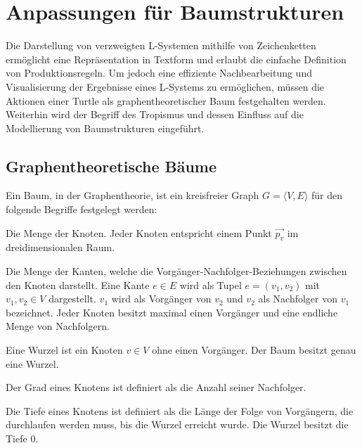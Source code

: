 \section{Anpassungen für Baumstrukturen}

Die Darstellung von verzweigten L-Systemen mithilfe von Zeichenketten ermöglicht eine Repräsentation in Textform und erlaubt die einfache Definition von Produktionsregeln. Um jedoch eine effiziente Nachbearbeitung und Visualisierung der Ergebnisse eines L-Systems zu ermöglichen, müssen die Aktionen einer Turtle als graphentheoretischer Baum festgehalten werden. Weiterhin wird der Begriff des Tropismus und dessen Einfluss auf die Modellierung von Baumstrukturen eingeführt.

\subsection{Graphentheoretische Bäume}

Ein Baum, in der Graphentheorie, ist ein kreisfreier Graph $G = \langle V,E\rangle$ für den folgende Begriffe festgelegt werden:

\begin{description}[labelindent]
	\item[\boldmath$V$] Die Menge der Knoten. Jeder Knoten entspricht einem Punkt $\overrightarrow{p_v}$ im dreidimensionalen Raum. \cite[S.358]{ThI:14}\\
	
	\item[\boldmath$E$] Die Menge der Kanten, welche die Vorgänger-Nachfolger-Beziehungen zwischen den Knoten darstellt. Eine Kante $e \in E$ wird als Tupel $e = (v_1, v_2)$ mit $v_1, v_2 \in V$ dargestellt. $v_1$ wird als Vorgänger von $v_2$ und $v_2$ als Nachfolger von $v_1$ bezeichnet. Jeder Knoten besitzt maximal einen Vorgänger und eine endliche Menge von Nachfolgern. \cite[S.358]{ThI:14} \cite[S.29]{AlgoDat:14}\\
	
	\item[\boldmath$Wurzel$] Eine Wurzel ist ein Knoten $v \in V$ ohne einen Vorgänger. Der Baum besitzt genau eine Wurzel. \cite[S.358]{ThI:14}\\
	
	\item[\boldmath$Grad$] Der Grad eines Knotens ist definiert als die Anzahl seiner Nachfolger. \cite[S.29]{AlgoDat:14}\\
	
	\item[\boldmath$Tiefe$] Die Tiefe eines Knotens ist definiert als die Länge der Folge von Vorgängern, die durchlaufen werden muss, bis die Wurzel erreicht wurde. Die Wurzel besitzt die Tiefe $0$. \cite[S.30]{AlgoDat:14}
\end{description}

